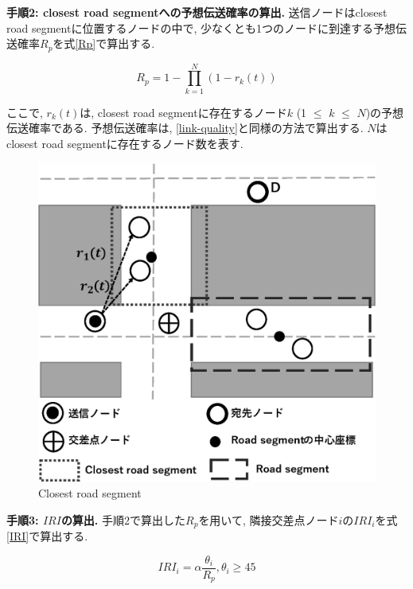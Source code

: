 \documentclass[10pt]{jreport}
\begin{document}
\textbf{手順2: closest road segmentへの予想伝送確率の算出.} 送信ノードはclosest road segmentに位置するノードの中で, 少なくとも1つのノードに到達する予想伝送確率$R_p$を式\ref{Rp}で算出する.

\begin{equation}
	\label{Rp}
	R_p = 1 - \prod_{k=1}^N (1 - r_{k}(t))
\end{equation}

ここで, $r_k(t)$は, closest road segmentに存在するノード$k$ (1 $\leq$  $k$ $\leq$ $N$)の予想伝送確率である. 予想伝送確率は, \ref{link-quality}と同様の方法で算出する. $N$はclosest road segmentに存在するノード数を表す. 

\begin{figure}[!ht]
	\centering
	\includegraphics[width=120mm]{figures/closest_road_segment.eps}
	\caption{Closest road segment}
	\label{fig:closest_road_segment}
\end{figure}

\textbf{手順3: $IRI$の算出.} 手順2で算出した$R_p$を用いて, 隣接交差点ノード$i$の$IRI_i$を式\ref{IRI}で算出する.

\begin{equation}
	\label{IRI}
	IRI_i =  \alpha\frac{\theta_i}{R_p}, \theta_i \geq 45
\end{equation}
\end{document}
